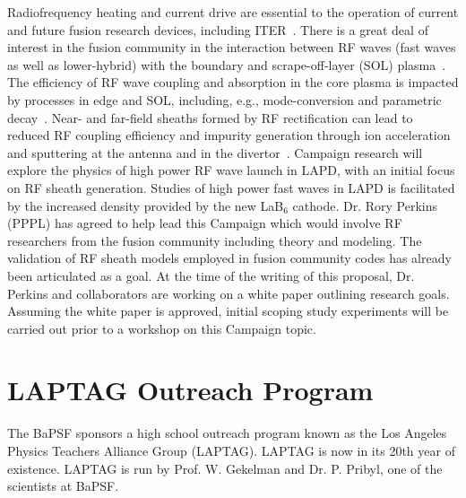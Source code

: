 \documentclass[11pt]{article}
\renewcommand{\cite}{\citep}
\begin{document}
 Radiofrequency heating and
  current drive are essential to the operation of current and future
  fusion research devices, including ITER~\cite{jaeger:2008}.  There is a great deal of
  interest in the fusion community in the interaction between RF waves
  (fast waves as well as lower-hybrid) with the boundary and
  scrape-off-layer (SOL) plasma~\cite{wallace:2011,jacquet:2011}.  The efficiency of RF wave coupling and
  absorption in the core plasma is impacted by processes in edge and
  SOL, including, e.g., mode-conversion and parametric decay~\cite{wukitch:2007,rost:2002}.  Near-
  and far-field sheaths formed by RF rectification can lead to reduced
  RF coupling efficiency and impurity generation through ion
  acceleration and sputtering at the antenna and in the divertor~\cite{ochoukov:2013,dippolito:2013}.
  Campaign research will explore the physics of high power RF wave
  launch in LAPD, with an initial focus on RF sheath generation.
  Studies of high power fast waves in LAPD is facilitated by the
  increased density provided by the new LaB$_6$ cathode.  Dr. Rory
  Perkins (PPPL) has agreed to help lead this Campaign which would
  involve RF researchers from the fusion community including theory
  and modeling.  The validation of RF sheath models employed in fusion
  community codes has already been articulated as a goal.  At the time of
  the writing of this proposal, Dr. Perkins and collaborators are working on a
  white paper outlining research goals.  Assuming the white paper is
  approved, initial scoping study experiments will be carried out
  prior to a workshop on this Campaign topic.  


\section{LAPTAG Outreach Program}

The BaPSF sponsors a high school outreach program known as the Los Angeles Physics Teachers Alliance Group  (LAPTAG).  
LAPTAG is now in its 20th year of existence.  LAPTAG is run by
Prof. W. Gekelman and Dr. P. Pribyl, one of the 
scientists at BaPSF.

\end{document}
